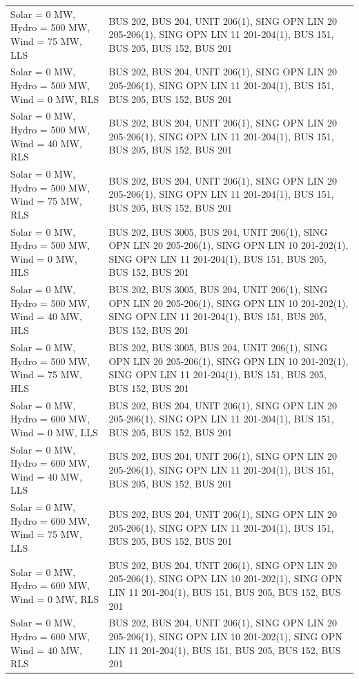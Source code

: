 \documentclass[10pt]{report}
\begin{document}
\begin{table}[H]
{\begin{tabular}{lp{15cm}}
Solar = 0 MW, Hydro = 500 MW, Wind = 75 MW, LLS & BUS 202, BUS 204, UNIT 206(1), SING OPN LIN   20 205-206(1), SING OPN LIN   11 201-204(1), BUS 151, BUS 205, BUS 152, BUS 201 \\
Solar = 0 MW, Hydro = 500 MW, Wind = 0 MW, RLS & BUS 202, BUS 204, UNIT 206(1), SING OPN LIN   20 205-206(1), SING OPN LIN   11 201-204(1), BUS 151, BUS 205, BUS 152, BUS 201 \\
Solar = 0 MW, Hydro = 500 MW, Wind = 40 MW, RLS & BUS 202, BUS 204, UNIT 206(1), SING OPN LIN   20 205-206(1), SING OPN LIN   11 201-204(1), BUS 151, BUS 205, BUS 152, BUS 201 \\
Solar = 0 MW, Hydro = 500 MW, Wind = 75 MW, RLS & BUS 202, BUS 204, UNIT 206(1), SING OPN LIN   20 205-206(1), SING OPN LIN   11 201-204(1), BUS 151, BUS 205, BUS 152, BUS 201 \\
Solar = 0 MW, Hydro = 500 MW, Wind = 0 MW, HLS & BUS 202, BUS 3005, BUS 204, UNIT 206(1), SING OPN LIN   20 205-206(1), SING OPN LIN   10 201-202(1), SING OPN LIN   11 201-204(1), BUS 151, BUS 205, BUS 152, BUS 201 \\
Solar = 0 MW, Hydro = 500 MW, Wind = 40 MW, HLS & BUS 202, BUS 3005, BUS 204, UNIT 206(1), SING OPN LIN   20 205-206(1), SING OPN LIN   10 201-202(1), SING OPN LIN   11 201-204(1), BUS 151, BUS 205, BUS 152, BUS 201 \\
Solar = 0 MW, Hydro = 500 MW, Wind = 75 MW, HLS & BUS 202, BUS 3005, BUS 204, UNIT 206(1), SING OPN LIN   20 205-206(1), SING OPN LIN   10 201-202(1), SING OPN LIN   11 201-204(1), BUS 151, BUS 205, BUS 152, BUS 201 \\
Solar = 0 MW, Hydro = 600 MW, Wind = 0 MW, LLS & BUS 202, BUS 204, UNIT 206(1), SING OPN LIN   20 205-206(1), SING OPN LIN   11 201-204(1), BUS 151, BUS 205, BUS 152, BUS 201 \\
Solar = 0 MW, Hydro = 600 MW, Wind = 40 MW, LLS & BUS 202, BUS 204, UNIT 206(1), SING OPN LIN   20 205-206(1), SING OPN LIN   11 201-204(1), BUS 151, BUS 205, BUS 152, BUS 201 \\
Solar = 0 MW, Hydro = 600 MW, Wind = 75 MW, LLS & BUS 202, BUS 204, UNIT 206(1), SING OPN LIN   20 205-206(1), SING OPN LIN   11 201-204(1), BUS 151, BUS 205, BUS 152, BUS 201 \\
Solar = 0 MW, Hydro = 600 MW, Wind = 0 MW, RLS & BUS 202, BUS 204, UNIT 206(1), SING OPN LIN   20 205-206(1), SING OPN LIN   10 201-202(1), SING OPN LIN   11 201-204(1), BUS 151, BUS 205, BUS 152, BUS 201 \\
Solar = 0 MW, Hydro = 600 MW, Wind = 40 MW, RLS & BUS 202, BUS 204, UNIT 206(1), SING OPN LIN   20 205-206(1), SING OPN LIN   10 201-202(1), SING OPN LIN   11 201-204(1), BUS 151, BUS 205, BUS 152, BUS 201 \\

\end{tabular}}
\end{table}
\end{document}
